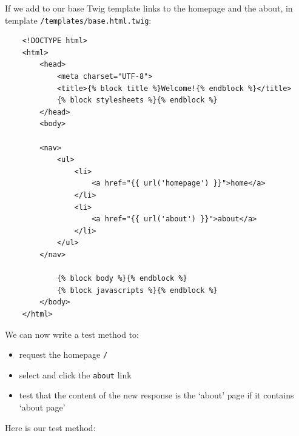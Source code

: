\documentclass[a4paperpaper,openright]{book}
\newenvironment{Shaded}{}{}
\newcommand{\AnnotationTok}[1]{\textcolor[rgb]{0.38,0.63,0.69}{\textbf{\textit{#1}}}}
\newcommand{\CommentTok}[1]{\textcolor[rgb]{0.38,0.63,0.69}{\textit{#1}}}
\newcommand{\KeywordTok}[1]{\textcolor[rgb]{0.00,0.44,0.13}{\textbf{#1}}}
\newcommand{\NormalTok}[1]{#1}
\newcommand{\OtherTok}[1]{\textcolor[rgb]{0.00,0.44,0.13}{#1}}
\newcommand{\StringTok}[1]{\textcolor[rgb]{0.25,0.44,0.63}{#1}}
\begin{document}
\begin{Shaded}
\end{Shaded}

If we add to our base Twig template links to the homepage and the about,
in template \texttt{/templates/base.html.twig}:

\begin{verbatim}
    <!DOCTYPE html>
    <html>
        <head>
            <meta charset="UTF-8">
            <title>{% block title %}Welcome!{% endblock %}</title>
            {% block stylesheets %}{% endblock %}
        </head>
        <body>

        <nav>
            <ul>
                <li>
                    <a href="{{ url('homepage') }}">home</a>
                </li>
                <li>
                    <a href="{{ url('about') }}">about</a>
                </li>
            </ul>
        </nav>

            {% block body %}{% endblock %}
            {% block javascripts %}{% endblock %}
        </body>
    </html>
\end{verbatim}

We can now write a test method to:

\begin{itemize}
\item
  request the homepage \texttt{/}
\item
  select and click the \texttt{about} link
\item
  test that the content of the new response is the `about' page if it
  contains `about page'
\end{itemize}

Here is our test method:
\end{document}
